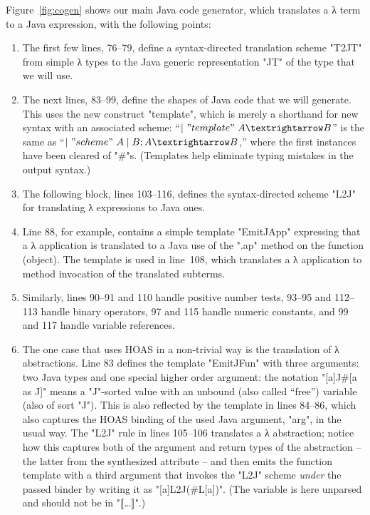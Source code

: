 \documentclass[letterpaper]{llncs}
\begin{document}
\begin{example}
  Figure~\ref{fig:cogen} shows our main Java code generator, which translates a λ term to a Java
  expression, with the following points:
  \begin{enumerate}

  \item The first few lines, 76--79, define a syntax-directed translation scheme "T2JT" from simple
    λ types to the Java generic representation "JT" of the type that we will use.

  \item The next lines, 83--99, define the shapes of Java code that we will generate. This uses the
    new construct "template", which is merely a shorthand for new syntax with an associated scheme:
    ``$|~"template"~A→B$'' is the same as ``$|~"scheme"~A \mid B ; A→B $,'' where the first
    instances have been cleared of "#"s. (Templates help eliminate typing mistakes in the output
    syntax.)

  \item The following block, lines 103--116, defines the syntax-directed scheme "L2J" for
    translating λ expressions to Java ones.

  \item Line 88, for example, contains a simple template "EmitJApp" expressing that a λ application
    is translated to a Java use of the ".ap" method on the function (object). The template is used
    in line~108, which translates a λ application to method invocation of the translated subterms.

  \item Similarly, lines 90--91 and 110 handle positive number tests, 93--95 and 112--113 handle
    binary operators, 97 and 115 handle numeric constants, and 99 and 117 handle variable
    references.

  \item The one case that uses HOAS in a non-trivial way is the translation of λ abstractions. Line
    83 defines the template "EmitJFun" with three arguments: two Java types and one special higher
    order argument: the notation "[a]J#[a as J]" means a "J"-sorted value with an unbound (also
    called ``free'') variable (also of sort "J"). This is also reflected by the template in lines
    84--86, which also captures the HOAS binding of the used Java argument, "arg", in the usual way.
    The "L2J" rule in lines 105--106 translates a λ abstraction; notice how this captures both of
    the argument and return types of the abstraction -- the latter from the synthesized attribute --
    and then emits the function template with a third argument that invokes the "L2J" scheme
    \emph{under} the passed binder by writing it as "[a]L2J(#L[a])". (The variable is here unparsed
    and should not be in "⟦…⟧".)


\end{enumerate}
\end{example}
\end{document}
